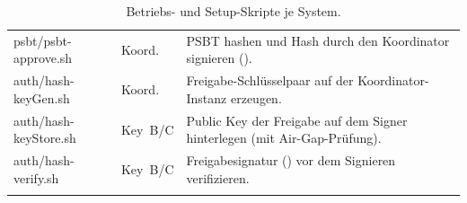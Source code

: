 \begin{xltabular}{\linewidth}{@{} >{\ttfamily\RaggedRight}p{4.2cm} l >{\RaggedRight}X @{}}
\addlinespace
psbt\slash psbt-approve.sh   & Koord. & \ac{PSBT} hashen und Hash durch den Koordinator signieren (). \\
auth\slash hash-keyGen.sh    & Koord. & Freigabe-Schlüsselpaar auf der Koordinator-Instanz erzeugen. \\
auth\slash hash-keyStore.sh  & Key~B/C & Public Key der Freigabe auf dem Signer hinterlegen (mit Air-Gap-Prüfung). \\
auth\slash hash-verify.sh    & Key~B/C & Freigabesignatur () vor dem Signieren verifizieren. \\
\caption{Betriebs- und Setup-Skripte je System.} \label{tab:skripte} \\

\end{xltabular}
\endgroup